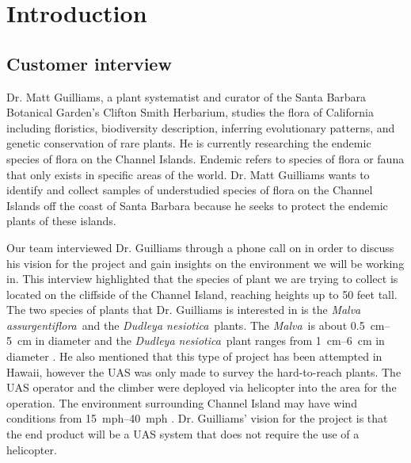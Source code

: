 \documentclass{wrcecapstone}
\newcommand{\Dudleyanesiotica}{\emph{Dudleya nesiotica}}
\newcommand{\Malvaassurgentiflora}{\emph{Malva assurgentiflora}}
\newcommand{\Malva}{\emph{Malva}}
\begin{document}
\section{Introduction}

\subsection{Customer interview}
Dr. Matt Guilliams, a plant systematist and curator of the Santa Barbara Botanical Garden's Clifton Smith Herbarium, studies the flora of California including floristics, biodiversity description, inferring evolutionary patterns, and genetic conservation of rare plants. He is currently researching the endemic species of flora on the Channel Islands. Endemic refers to species of flora or fauna that only exists in specific areas of the world. Dr. Matt Guilliams wants to identify and collect samples of understudied species of flora on the Channel Islands off the coast of Santa Barbara because he seeks to protect the endemic plants of these islands.

Our team interviewed Dr. Guilliams through a phone call on  in order to discuss his vision for the project and gain insights on the environment we will be working in. This interview highlighted that the species of plant we are trying to collect is located on the cliffside of the Channel Island, reaching heights up to 50 feet tall. The two species of plants that Dr. Guilliams is interested in is the \Malvaassurgentiflora\ and the \Dudleyanesiotica\ plants. The \Malva\ is about \SIrange{0.5}{5}{\centi\meter} in diameter and the \Dudleyanesiotica\ plant ranges from \SIrange{1}{6}{\centi\meter} in diameter \cite{jeps2019dudleya, wikipedia2019malva}. He also mentioned that this type of project has been attempted in Hawaii, however the UAS was only made to survey the hard-to-reach plants.  The UAS operator and the climber were deployed via helicopter into the area for the operation. The  environment surrounding Channel Island may have wind conditions from \SIrange{15}{40}{mph} \cite{nps2019weather}.  Dr. Guilliams’ vision for the project is that the end product will be a UAS system that does not require the use of a helicopter.
\end{document}
